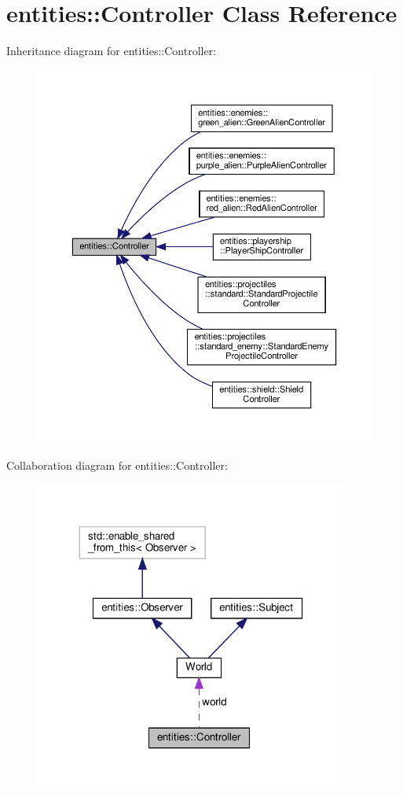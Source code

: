 \hypertarget{classentities_1_1Controller}{}\section{entities\+:\+:Controller Class Reference}
\label{classentities_1_1Controller}


Inheritance diagram for entities\+:\+:Controller\+:\nopagebreak
\begin{figure}[H]
\begin{center}
\leavevmode
\includegraphics[width=350pt]{classentities_1_1Controller__inherit__graph}
\end{center}
\end{figure}


Collaboration diagram for entities\+:\+:Controller\+:\nopagebreak
\begin{figure}[H]
\begin{center}
\leavevmode
\includegraphics[width=293pt]{classentities_1_1Controller__coll__graph}
\end{center}
\end{figure}
